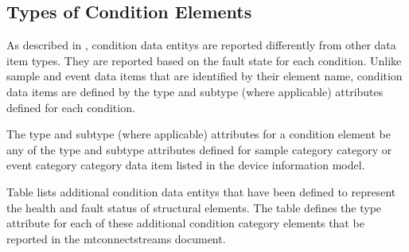 



\subsection{Types of Condition Elements}
\label{sec:Types of Condition Elements}

As described in , \gls{condition} \glspl{data entity} are reported differently from other data item \glspl{type}.  They are reported based on the \gls{fault state} for each \gls{condition}.  Unlike \gls{sample} and \gls{event} data items that are identified by their \gls{element name}, \gls{condition} data items are defined by the \gls{type} and \gls{subtype} (where applicable) attributes defined for each \gls{condition}.

The \gls{type} and \gls{subtype} (where applicable) attributes for a \gls{condition} element \may be any of the \gls{type} and \gls{subtype} attributes defined for \gls{sample category} category or \gls{event category} category data item listed in the \gls{device information model}.

Table  lists additional \gls{condition} \glspl{data entity} that have been defined to represent the health and fault status of \glspl{structural element}.  The table defines the \gls{type} attribute for each of these additional \gls{condition} category elements that \may be reported in the \gls{mtconnectstreams} document.  



